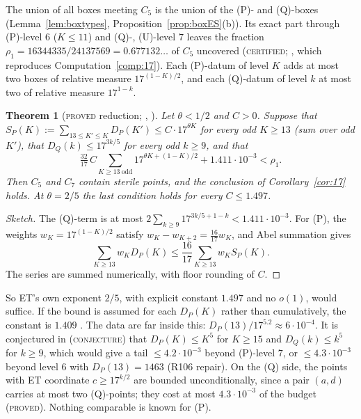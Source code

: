 \documentclass[11pt,reqno]{amsart}
\newtheorem{theorem}{Theorem}[section]
\theoremstyle{definition}
\newcommand{\status}[1]{\textup{\textsc{#1}}}
\begin{document}
The union of all boxes meeting $C_5$ is the union of the (P)- and
(Q)-boxes (Lemma~\ref{lem:boxtypes}, Proposition~\ref{prop:boxES}(b)).
Its exact part through (P)-level $6$ ($K\le11$) and (Q)-, (U)-level $7$
leaves the fraction
$\rho_1=16344335/24137569=0.677132\ldots$ of $C_5$ uncovered
(\status{certified}; \cite[Comp.~3.1]{PM17B}, which reproduces
Computation~\ref{comp:17}).  Each (P)-datum of level $K$ adds at most two
boxes of relative measure $17^{(1-K)/2}$, and each (Q)-datum of level $k$
at most two of relative measure $17^{1-k}$.

\begin{theorem}[\status{proved} reduction; {\cite[Thm.~4.1]{PM17B}, \cite[Lemma~1.1]{PM17C}}]\label{thm:explicit17}
Let $\theta<1/2$ and $C>0$.  Suppose that
$S_P(K):=\sum_{13\le K'\le K}D_P(K')\le C\cdot17^{\theta K}$ for every
odd $K\ge13$ (sum over odd $K'$), that $D_Q(k)\le17^{3k/5}$ for every
odd $k\ge9$, and that
\[
\tfrac{32}{17}\,C\sum_{K\ge13\ \mathrm{odd}}17^{\theta K+(1-K)/2}+1.411\cdot10^{-3}<\rho_1 .
\]
Then $C_5$ and $C_7$ contain sterile points, and the conclusion of
Corollary~\ref{cor:17} holds.  At $\theta=2/5$ the last condition holds
for every $C\le1.497$.
\end{theorem}

\begin{proof}[Sketch]
The (Q)-term is at most $2\sum_{k\ge9}17^{3k/5+1-k}<1.411\cdot10^{-3}$.
For (P), the weights $w_K=17^{(1-K)/2}$ satisfy
$w_K-w_{K+2}=\tfrac{16}{17}w_K$, and Abel summation gives
\[
\textstyle\sum_{K\ge13}w_KD_P(K)\le\frac{16}{17}\sum_{K\ge13}w_KS_P(K).
\]
The series are summed numerically, with floor rounding of $C$.
\end{proof}

So ET's own exponent $2/5$, with explicit constant $1.497$ and no $o(1)$,
would suffice.  If the bound is assumed for each $D_P(K)$ rather than
cumulatively, the constant is $1.409$ \cite[\S4]{PM17B}.  The data are far
inside this: $D_P(13)/17^{5.2}\approx6\cdot10^{-4}$.  It is conjectured in
\cite[Conj.~4.2]{PM17B} (\status{conjecture}) that $D_P(K)\le K^5$ for
$K\ge15$ and $D_Q(k)\le k^5$ for $k\ge9$, which would give a tail
$\le4.2\cdot10^{-3}$ beyond (P)-level $7$, or $\le4.3\cdot10^{-3}$
beyond level $6$ with $D_P(13)=1463$ (R106 repair).  On the (Q) side, the points with ET coordinate $c\ge17^{k/2}$
are bounded unconditionally, since a pair $(a,d)$ carries at most two
(Q)-points; they cost at most $4.3\cdot10^{-3}$ of the budget
\cite[Lemma~2.1, Cor.~2.2]{PM17C} (\status{proved}).  Nothing comparable
is known for (P).
\end{document}
